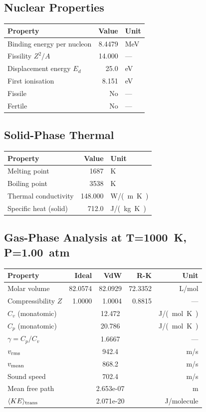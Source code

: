 \documentclass[11pt,a4paper]{article}
\begin{document}
\subsection{Nuclear Properties}
\begin{tabular}{lrl}
  \toprule
  Property & Value & Unit \\
  \midrule
  Binding energy per nucleon & 8.4479 & \si{MeV} \\
  Fissility $Z^2/A$ & 14.000 & --- \\
  Displacement energy $E_d$ & 25.0 & \si{eV} \\
  First ionisation & 8.151 & \si{eV} \\
  Fissile & No & --- \\
  Fertile & No & --- \\
  \bottomrule
\end{tabular}

\subsection{Solid-Phase Thermal}
\begin{tabular}{lrl}
  \toprule
  Property & Value & Unit \\
  \midrule
  Melting point & 1687 & \si{K} \\
  Boiling point & 3538 & \si{K} \\
  Thermal conductivity & 148.000 & \si{W/(m.K)} \\
  Specific heat (solid) & 712.0 & \si{J/(kg.K)} \\
  \bottomrule
\end{tabular}

\subsection{Gas-Phase Analysis at T=\SI{1000}{K}, P=\SI{1.00}{atm}}
\begin{tabular}{lrrrr}
  \toprule
  Property & Ideal & VdW & R-K & Unit \\
  \midrule
  Molar volume & 82.0574 & 82.0929 & 72.3352 & \si{L/mol} \\
  Compressibility $Z$ & 1.0000 & 1.0004 & 0.8815 & --- \\
  \midrule
  $C_v$ (monatomic) & \multicolumn{3}{c}{12.472} & \si{J/(mol.K)} \\
  $C_p$ (monatomic) & \multicolumn{3}{c}{20.786} & \si{J/(mol.K)} \\
  $\gamma = C_p/C_v$ & \multicolumn{3}{c}{1.6667} & --- \\
  $v_{\rm rms}$ & \multicolumn{3}{c}{942.4} & \si{m/s} \\
  $v_{\rm mean}$ & \multicolumn{3}{c}{868.2} & \si{m/s} \\
  Sound speed & \multicolumn{3}{c}{702.4} & \si{m/s} \\
  Mean free path & \multicolumn{3}{c}{2.653e-07} & \si{m} \\
  $\langle KE \rangle_{\rm trans}$ & \multicolumn{3}{c}{2.071e-20} & \si{J/molecule} \\
  \bottomrule
\end{tabular}
\end{document}
